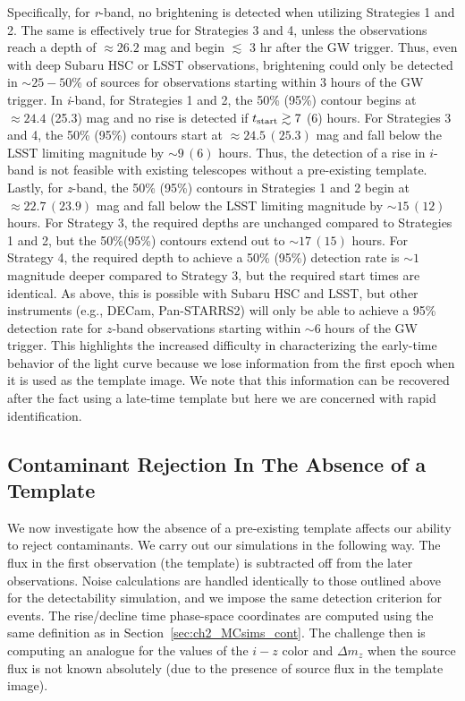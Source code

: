 Specifically, for {\em r}-band, no brightening is detected when utilizing Strategies 1 and 2. The same is effectively true for Strategies 3 and 4, unless the observations reach a depth of $\approx 26.2$ mag and begin $\lesssim$ 3 hr after the GW trigger. Thus, even with deep Subaru HSC or LSST observations, brightening could only be detected in $\sim25-50$\% of sources for observations starting within 3 hours of the GW trigger. In {\em i}-band, for Strategies 1 and 2, the 50\% (95\%) contour begins at $\approx 24.4$ (25.3) mag and no rise is detected if $t_{{\rm start}} \gtrsim 7$ (6) hours. For Strategies 3 and 4, the 50\% (95\%) contours start at $\approx 24.5\,(25.3)$ mag and fall below the LSST limiting magnitude by $\sim 9\,(6)$ hours. Thus, the detection of a rise in $i$-band is not feasible with existing telescopes without a pre-existing template. Lastly, for {\em z}-band, the 50\% (95\%) contours in Strategies 1 and 2 begin at $\approx 22.7\,(23.9)$ mag and fall below the LSST limiting magnitude by $\sim 15\,(12)$ hours. For Strategy 3, the required depths are unchanged compared to Strategies 1 and 2, but the 50\%(95\%) contours extend out to $\sim 17\,(15)$ hours. For Strategy 4, the required depth to achieve a 50\% (95\%) detection rate is $\sim 1$ magnitude deeper compared to Strategy 3, but the required start times are identical. As above, this is possible with Subaru HSC and LSST, but other instruments (e.g., DECam, Pan-STARRS2) will only be able to achieve a 95\% detection rate for $z$-band observations starting within $\sim6$ hours of the GW trigger. This highlights the increased difficulty in characterizing the early-time behavior of the light curve because we lose information from the first epoch when it is used as the template image. We note that this information can be recovered after the fact using a late-time template but here we are concerned with rapid identification.

\subsection{Contaminant Rejection In The Absence of a Template}
\label{sec:ch2_rejection}
We now investigate how the absence of a pre-existing template affects our ability to reject contaminants. We carry out our simulations in the following way. The flux in the first observation (the template) is subtracted off from the later observations. Noise calculations are handled identically to those outlined above for the detectability simulation, and we impose the same detection criterion for events. The rise/decline time phase-space coordinates are computed using the same definition as in Section~\ref{sec:ch2_MCsims_cont}. The challenge then is computing an analogue for the values of the $i-z$ color and $\Delta m_z$ when the source flux is not known absolutely (due to the presence of source flux in the template image).

